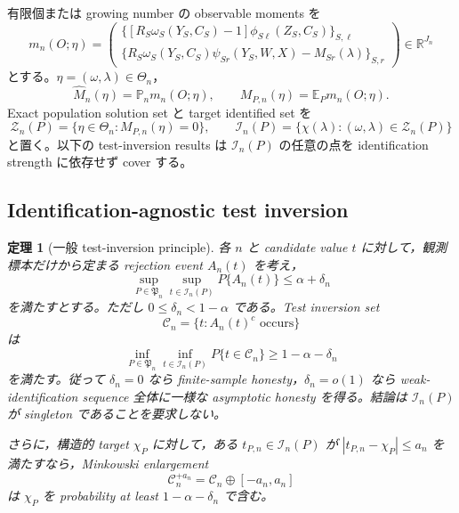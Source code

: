 \documentclass[11pt,a4paper]{ltjsarticle}
\newtheorem{theorem}{定理}[section]
\theoremstyle{remark}
\newcommand{\E}{\mathbb E}
\newcommand{\Pp}{\mathbb P}
\newcommand{\R}{\mathbb R}
\newcommand{\wh}{\widehat}
\newcommand{\cC}{\mathcal C}
\newcommand{\cI}{\mathcal I}
\newcommand{\cZ}{\mathcal Z}
\begin{document}
有限個または growing number の observable moments を
\begin{equation}
m_n(O;\eta)
=\begin{pmatrix}
\{[R_S\omega_S(Y_S,C_S)-1]\phi_{S\ell}(Z_S,C_S)\}_{S,\ell}\\[1mm]
\{R_S\omega_S(Y_S,C_S)\psi_{Sr}(Y_S,W,X)-M_{Sr}(\lambda)\}_{S,r}
\end{pmatrix}
\in\R^{J_n}
\label{eq:weakobservablemoments}
\end{equation}
とする。$\eta=(\omega,\lambda)\in\Theta_n$，
\[
\wh M_n(\eta)=\Pp_nm_n(O;\eta),
\qquad
M_{P,n}(\eta)=\E_Pm_n(O;\eta).
\]
Exact population solution set と target identified set を
\begin{equation}
\cZ_n(P)=\{\eta\in\Theta_n:M_{P,n}(\eta)=0\},
\qquad
\cI_n(P)=\{\chi(\lambda):(\omega,\lambda)\in\cZ_n(P)\}
\label{eq:weakidentifiedset}
\end{equation}
と置く。以下の test-inversion results は $\cI_n(P)$ の任意の点を identification strength に依存せず cover する。

\subsection{Identification-agnostic test inversion}

\begin{theorem}[一般 test-inversion principle]\label{thm:generaltestinversion}
各 $n$ と candidate value $t$ に対して，観測標本だけから定まる rejection event $A_n(t)$ を考え，
\begin{equation}
\sup_{P\in\mathfrak P_n}\sup_{t\in\cI_n(P)}
P\{A_n(t)\}\le \alpha+\delta_n
\label{eq:testsizeidentified}
\end{equation}
を満たすとする。ただし $0\le\delta_n<1-\alpha$ である。Test inversion set
\begin{equation}
\cC_n=\{t:A_n(t)^c\text{ occurs}\}
\label{eq:generaltestinversionset}
\end{equation}
は
\begin{equation}
\inf_{P\in\mathfrak P_n}\inf_{t\in\cI_n(P)}
P\{t\in\cC_n\}\ge1-\alpha-\delta_n
\label{eq:generaltestinversioncoverage}
\end{equation}
を満たす。従って $\delta_n=0$ なら finite-sample honesty，$\delta_n=o(1)$ なら weak-identification sequence 全体に一様な asymptotic honesty を得る。結論は $\cI_n(P)$ が singleton であることを要求しない。

さらに，構造的 target $\chi_P$ に対して，ある $t_{P,n}\in\cI_n(P)$ が
$|t_{P,n}-\chi_P|\le a_n$ を満たすなら，Minkowski enlargement
\[
\cC_n^{+a_n}=\cC_n\oplus[-a_n,a_n]
\]
は $\chi_P$ を probability at least $1-\alpha-\delta_n$ で含む。
\end{theorem}
\end{document}
